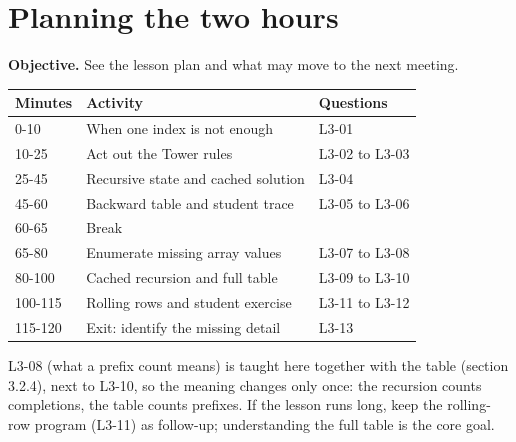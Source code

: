 \documentclass[11pt,a4paper,oneside]{report}
\newcommand{\sectiongoal}[1]{\par{\color{quiet}\textbf{Objective.} #1}\par\smallskip}
\begin{document}
\section{Planning the two hours}
\sectiongoal{See the lesson plan and what may move to the next meeting.}
\par\medskip\begingroup\small\setlength{\tabcolsep}{4pt}\renewcommand{\arraystretch}{1.3}\begin{tabularx}{\linewidth}{>{\raggedright\arraybackslash}p{16mm}>{\raggedright\arraybackslash}X>{\raggedright\arraybackslash}p{26mm}}\toprule\textbf{Minutes} & \textbf{Activity} & \textbf{Questions}\\\midrule
{}0-10 & When one index is not enough & L3-01\\
{}10-25 & Act out the Tower rules & L3-02 to L3-03\\
{}25-45 & Recursive state and cached solution & L3-04\\
{}45-60 & Backward table and student trace & L3-05 to L3-06\\
{}60-65 & Break & \\
{}65-80 & Enumerate missing array values & L3-07 to L3-08\\
{}80-100 & Cached recursion and full table & L3-09 to L3-10\\
{}100-115 & Rolling rows and student exercise & L3-11 to L3-12\\
{}115-120 & Exit: identify the missing detail & L3-13\\
\bottomrule\end{tabularx}\endgroup\par\medskip
L3-08 (what a prefix count means) is taught here together with the table (section 3.2.4), next to L3-10, so the meaning changes only once: the recursion counts completions, the table counts prefixes. If the lesson runs long, keep the rolling-row program (L3-11) as follow-up; understanding the full table is the core goal.
\end{document}
